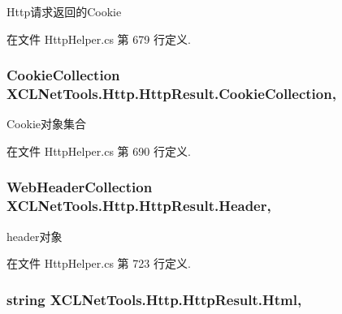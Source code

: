 Http请求返回的\-Cookie 



在文件 Http\-Helper.\-cs 第 679 行定义.

\hypertarget{class_x_c_l_net_tools_1_1_http_1_1_http_result_af9aca82ecce2ed0364caf3343fbba601}{
\subsubsection[{Cookie\-Collection}]{\setlength{\rightskip}{0pt plus 5cm}Cookie\-Collection X\-C\-L\-Net\-Tools.\-Http.\-Http\-Result.\-Cookie\-Collection\hspace{0.3cm}{\ttfamily [get]}, {\ttfamily [set]}}}\label{class_x_c_l_net_tools_1_1_http_1_1_http_result_af9aca82ecce2ed0364caf3343fbba601}


Cookie对象集合 



在文件 Http\-Helper.\-cs 第 690 行定义.

\hypertarget{class_x_c_l_net_tools_1_1_http_1_1_http_result_a332863b39f9b28f275a43048a91754ba}{
\subsubsection[{Header}]{\setlength{\rightskip}{0pt plus 5cm}Web\-Header\-Collection X\-C\-L\-Net\-Tools.\-Http.\-Http\-Result.\-Header\hspace{0.3cm}{\ttfamily [get]}, {\ttfamily [set]}}}\label{class_x_c_l_net_tools_1_1_http_1_1_http_result_a332863b39f9b28f275a43048a91754ba}


header对象 



在文件 Http\-Helper.\-cs 第 723 行定义.

\hypertarget{class_x_c_l_net_tools_1_1_http_1_1_http_result_a5f96bed917f8a3a43b9bc38695f5fb79}{
\subsubsection[{Html}]{\setlength{\rightskip}{0pt plus 5cm}string X\-C\-L\-Net\-Tools.\-Http.\-Http\-Result.\-Html\hspace{0.3cm}{\ttfamily [get]}, {\ttfamily [set]}}}\label{class_x_c_l_net_tools_1_1_http_1_1_http_result_a5f96bed917f8a3a43b9bc38695f5fb79}


